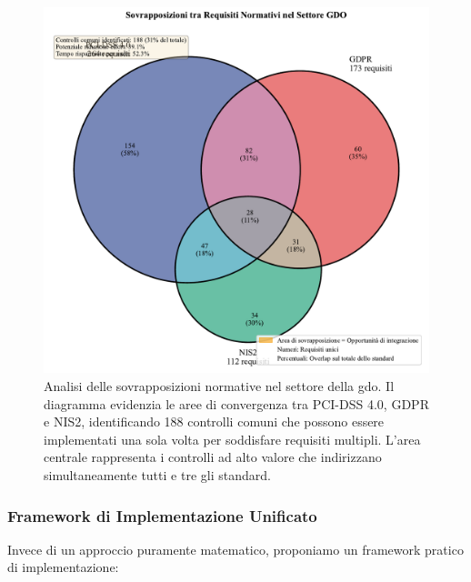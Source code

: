 \begin{figure}[htbp]
\centering
\includegraphics[width=1\textwidth]{thesis_figures/cap4/figura_4_1_venn_normative.pdf}
\caption{Analisi delle sovrapposizioni normative nel settore della \gls{gdo}. Il diagramma evidenzia le aree di convergenza tra PCI-DSS 4.0, GDPR e NIS2, identificando 188 controlli comuni che possono essere implementati una sola volta per soddisfare requisiti multipli. L'area centrale rappresenta i controlli ad alto valore che indirizzano simultaneamente tutti e tre gli standard.}
\label{fig:venn_normative}
\end{figure}

\subsubsection{\texorpdfstring{Framework di Implementazione Unificato}{4.3.1.2 - Framework di Implementazione Unificato}}

Invece di un approccio puramente matematico, proponiamo un framework pratico di implementazione:

